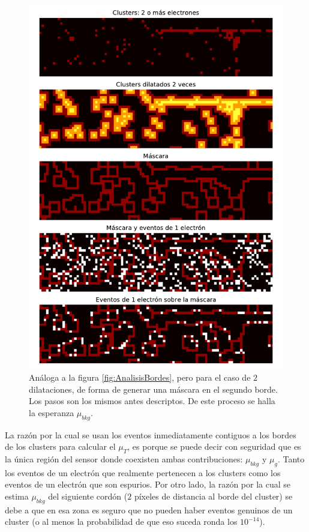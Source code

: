 \begin{figure}[h]
    \centering
    \includegraphics[scale=0.7]{Figs/analisis_bordesx2.pdf}
    \caption{\footnotesize{Análoga a la figura \ref{fig:AnalisisBordes}, pero para el caso de $2$ dilataciones, de forma de generar una máscara en el segundo borde. Los pasos son los mismos antes descriptos. De este proceso se halla la esperanza $\mu_{bkg}$.}}
    \label{fig:AnalisisBordesx2}
\end{figure}
La razón por la cual se usan los eventos inmediatamente contiguos a los bordes de los clusters para calcular el $\mu_{T}$, es porque se puede decir con seguridad que es la única región del sensor donde coexisten ambas contribuciones: $\mu_{bkg}$ y $\mu_{g}$. Tanto los eventos de un electrón que realmente pertenecen a los clusters como los eventos de un electrón que son espurios. Por otro lado, la razón por la cual se estima $\mu_{bkg}$ del siguiente cordón ($2$ píxeles de distancia al borde del cluster) se debe a que en esa zona es seguro que no pueden haber eventos genuinos de un cluster (o al menos la probabilidad de que eso suceda ronda los $10^{-14}$).\\
